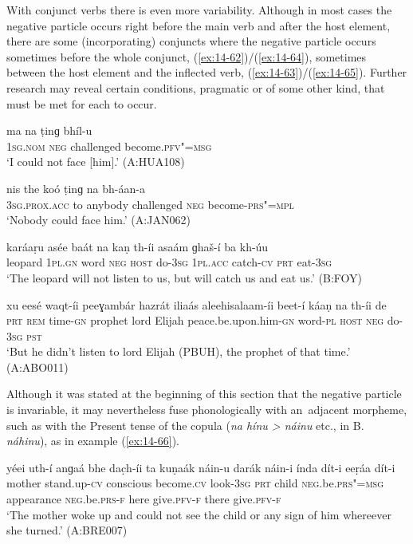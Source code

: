 With conjunct verbs there is even more variability. Although in most cases the negative particle occurs right before the main verb and after the host element, there are some (incorporating) conjuncts where the negative particle occurs sometimes before the whole conjunct, (\ref{ex:14-62})/(\ref{ex:14-64}), sometimes between the host element and the inflected verb, (\ref{ex:14-63})/(\ref{ex:14-65}). Further research may reveal certain conditions, pragmatic or of some other kind, that must be met for each to occur. 

\begin{exe}
\ex
\label{ex:14-62}
\gll ma na ṭinɡ bhíl-u \\
\textsc{1sg.nom} \textsc{neg} challenged become.\textsc{pfv"=msg } \\
\glt `I could not face [him].' (A:HUA108)

\ex
\label{ex:14-63}
\gll nis the koó ṭinɡ na  bh-áan-a \\
\textsc{3sg.prox.acc} to anybody challenged \textsc{neg} become-\textsc{prs"=mpl } \\
\glt `Nobody could face him.' (A:JAN062)

\ex
\label{ex:14-64}
\gll karáaṛu asée baát na kaṇ th-íi asaám ɡhaš-í  ba kh-úu \\
leopard \textsc{1pl.gn} word \textsc{neg} \textsc{host} do-\textsc{3sg} \textsc{1pl.acc} catch-\textsc{cv}  \textsc{prt} eat-\textsc{3sg} \\
\glt `The leopard will not listen to us, but will catch us and eat us.' (B:FOY)

\ex
\label{ex:14-65}
\gll xu eesé waqt-íi peeɣambár hazrát iliaás aleehisalaam-íi  beet-í
káaṇ na th-íi  de \\
\textsc{prt} \textsc{rem} time-\textsc{gn} prophet lord  Elijah peace.be.upon.him-\textsc{gn} word-\textsc{pl} \textsc{host} \textsc{neg} do-\textsc{3sg} \textsc{pst} \\
\glt `But he didn't listen to lord Elijah (PBUH), the prophet of that time.' (A:ABO011)
\end{exe}

Although it was stated at the beginning of this section that the negative particle is invariable, it may nevertheless fuse phonologically with an~adjacent morpheme, such as with the Present tense of the copula (\textit{na hínu {\textgreater} náinu} etc., in B. \textit{náhinu}), as in example (\ref{ex:14-66}).

\begin{exe}
\ex
\label{ex:14-66}
\gll yéei uth-í anɡaá bhe dac̣h-íi  ta kuṇaák náin-u darák náin-i  índa dít-i eeṛáa dít-i \\
mother stand.up-\textsc{cv} conscious become.\textsc{cv} look-\textsc{3sg}  \textsc{prt} child \textsc{neg.}be.\textsc{prs"=msg} appearance \textsc{neg.}be.\textsc{prs-f}  here give.\textsc{pfv-f} there give.\textsc{pfv-f} \\
\glt `The mother woke up and could not see the child or any sign of him whereever she turned.' (A:BRE007)
\end{exe}


